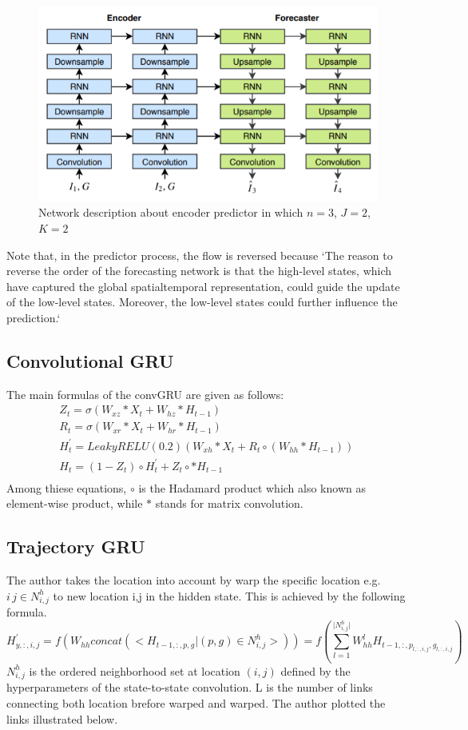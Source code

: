 \documentclass{article}
\begin{document}
\begin{figure}[H]
\centering
\includegraphics[width=\linewidth]{TrajGRU_EP}
\caption{Network description about encoder predictor in which $n=3$, $J=2$,$K=2$}
\end{figure}
Note that, in the predictor process, the flow is reversed because `The reason to reverse the order of the forecasting network is that the high-level states, which have captured the global spatialtemporal representation, could guide the update of the low-level states. Moreover, the low-level states could further influence the prediction.`

\subsection{Convolutional GRU}
The main formulas of the convGRU are given as follows:
\begin{equation}
\begin{split}
Z_t=\sigma(W_{xz}*X_t+W_{hz}*H_{t-1})\,\\
R_t=\sigma(W_{xr}*X_t+W_{hr}*H_{t-1})\,\\
H_t^{\prime}=LeakyRELU(0.2)(W_{xh}*X_t+R_t \circ (W_{hh}*H_{t-1}))\,\\
H_t=(1-Z_t)\circ H_t^{\prime}+Z_t \circ *H_{t-1}\\
\end{split}
\end{equation}
Among thiese equations, $\circ$ is the Hadamard product which also known as element-wise product, while $*$ stands for matrix convolution.

\subsection{Trajectory GRU}
The author takes the location into account by warp the specific location e.g. $i\,j \in N_{i,j}^h$ to new location i,j in the hidden state. This is achieved by the following formula.
\begin{equation}
H_{y,:,i,j}^{\prime}=f(W_{hh}concat(<H_{t-1,:,p,g} \vert (p,g) \in N_{i,j}^{h}>))=f(\sum_{l=1}^{\vert N_{i,j}^h \vert}W_{hh}^lH_{t-1,:,p_{l,:,i,j},g_{l,:,i,j}})
\end{equation}
$N_{i,j}^{h}$ is the ordered neighborhood set at location $(i,j)$ defined by the hyperparameters of the state-to-state convolution. L is the number of links connecting both location brefore warped and warped. The author plotted the links illustrated below. 
\end{document}
